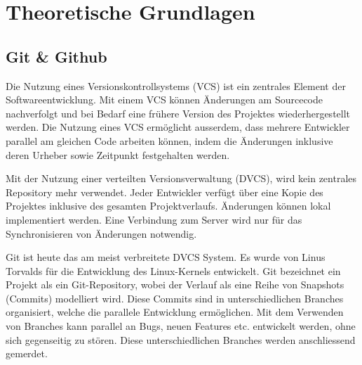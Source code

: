 


\chapter{Theoretische Grundlagen} %

\label{Chapter2} %


\section{Git \& Github}
Die Nutzung eines Versionskontrollsystems (VCS) ist ein zentrales Element der Softwareentwicklung. Mit einem VCS können Änderungen am Sourcecode nachverfolgt und bei Bedarf eine frühere Version des Projektes wiederhergestellt werden. Die Nutzung eines VCS ermöglicht ausserdem, dass mehrere Entwickler parallel am gleichen Code arbeiten können, indem die Änderungen inklusive deren Urheber sowie Zeitpunkt festgehalten werden. 

Mit der Nutzung einer verteilten Versionsverwaltung (DVCS), wird kein zentrales Repository mehr verwendet. Jeder Entwickler verfügt über eine Kopie des Projektes inklusive des gesamten Projektverlaufs. Änderungen können lokal implementiert werden. Eine Verbindung zum Server wird nur für das Synchronisieren von Änderungen notwendig. \parencite{noauthor_informationen_2025} 

Git ist heute das am meist verbreitete DVCS System. Es wurde von Linus Torvalds für die Entwicklung des Linux-Kernels entwickelt. \parencite{zack_git_2018} Git bezeichnet ein Projekt als ein Git-Repository, wobei der Verlauf als eine Reihe von Snapshots (Commits) modelliert wird. Diese Commits sind in unterschiedlichen Branches organisiert, welche die parallele Entwicklung ermöglichen. Mit dem Verwenden von Branches kann parallel an Bugs, neuen Features etc. entwickelt werden, ohne sich gegenseitig zu stören. Diese unterschiedlichen Branches werden anschliessend gemerdet. 

